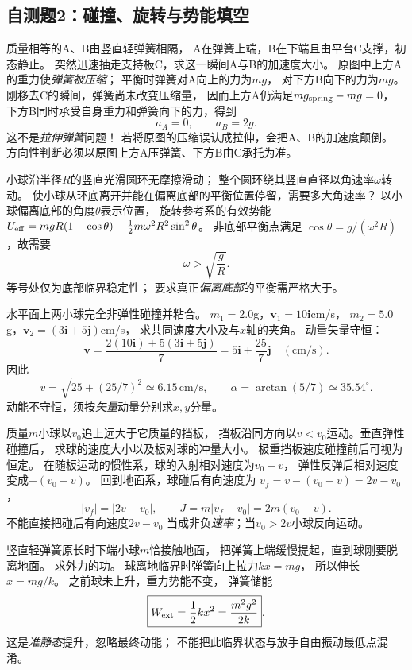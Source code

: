 \subsection{自测题2：碰撞、旋转与势能填空}

\problemtext 质量相等的A、B由竖直轻弹簧相隔，
A在弹簧上端，B在下端且由平台C支撑，初态静止。
突然迅速抽走支持板C，求这一瞬间A与B的加速度大小。
\workings
原图中上方A的重力使\emph{弹簧被压缩}；
平衡时弹簧对A向上的力为$mg$，
对下方B向下的力为$mg$。
刚移去C的瞬间，弹簧尚未改变压缩量，
因而上方A仍满足$mg_{\rm spring}-mg=0$，
下方B同时承受自身重力和弹簧向下的力，得到
\[
\boxed{a_A=0},\qquad \boxed{a_B=2g}.
\]
\crosscheck 这不是\emph{拉伸弹簧}问题！
若将原图的压缩误认成拉伸，会把A、B的加速度颠倒。
方向性判断必须以原图上方A压弹簧、下方B由C承托为准。

\problemtext 小球沿半径$R$的竖直光滑圆环无摩擦滑动；
整个圆环绕其竖直直径以角速率$\omega$转动。
使小球从环底离开并能在偏离底部的平衡位置停留，需要多大角速率？
\workings
以小球偏离底部的角度$\theta$表示位置，
旋转参考系的有效势能
$U_{\rm eff}=mgR(1-\cos\theta)
-\tfrac12m\omega^2R^2\sin^2\theta$。
非底部平衡点满足
$\cos\theta=g/(\omega^2R)$，故需要
\[
\boxed{\omega>\sqrt{\frac gR}}.
\]
\crosscheck 等号处仅为底部临界稳定性；
要求真正\emph{偏离底部}的平衡需严格大于。

\problemtext 水平面上两小球完全非弹性碰撞并粘合。
$m_1=2.0$g，$\bm v_1=10\bm i$cm/s，
$m_2=5.0$g，$\bm v_2=(3\bm i+5\bm j)$cm/s，
求共同速度大小及与$x$轴的夹角。
\workings
动量矢量守恒：
\[
\bm v=\frac{2(10\bm i)+5(3\bm i+5\bm j)}{7}
=5\bm i+\frac{25}{7}\bm j\quad(\mathrm{cm/s}).
\]
因此
\[
\boxed{v=\sqrt{25+(25/7)^2}\simeq6.15\,\mathrm{cm/s}},
\qquad
\boxed{\alpha=\arctan(5/7)\simeq35.54^\circ}.
\]
\crosscheck 动能不守恒，须按\emph{矢量}动量分别求$x,y$分量。

\problemtext 质量$m$小球以$v_0$追上远大于它质量的挡板，
挡板沿同方向以$v<v_0$运动。垂直弹性碰撞后，
求球的速度大小以及板对球的冲量大小。
\workings
极重挡板速度碰撞前后可视为恒定。
在随板运动的惯性系，球的入射相对速度为$v_0-v$，
弹性反弹后相对速度变成$-(v_0-v)$。
回到地面系，球碰后有向速度为
$v_f=v-(v_0-v)=2v-v_0$，
\[
\boxed{|v_f|=|2v-v_0|},\qquad
\boxed{J=m|v_f-v_0|=2m(v_0-v)}.
\]
\crosscheck 不能直接把碰后有向速度$2v-v_0$
当成非负\emph{速率}；当$v_0>2v$小球反向运动。

\problemtext 竖直轻弹簧原长时下端小球$m$恰接触地面，
把弹簧上端缓慢提起，直到球刚要脱离地面。
求外力的功。
\workings
球离地临界时弹簧向上拉力$kx=mg$，
所以伸长$x=mg/k$。
之前球未上升，重力势能不变，
弹簧储能
\[
\boxed{W_{\rm ext}=\frac12kx^2=\frac{m^2g^2}{2k}}.
\]
\crosscheck 这是\emph{准静态}提升，忽略最终动能；
不能把此临界状态与放手自由振动最低点混淆。

